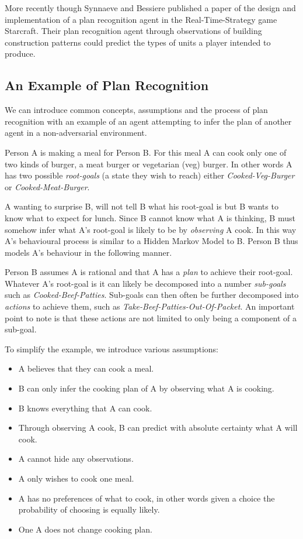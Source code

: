 \documentclass[parskip]{cs4rep}
\begin{document}
More recently though Synnaeve and Bessiere \cite{conf/aiide/SynnaeveB11} published a paper of the design and implementation of a plan recognition agent in the Real-Time-Strategy game Starcraft. Their plan recognition agent through observations of building construction patterns could predict the types of units a player intended to produce.

\subsection{An Example of Plan Recognition}

We can introduce common concepts, assumptions and the process of plan recognition with an example of an agent attempting to infer the plan of another agent in a non-adversarial environment. 

Person A is making a meal for Person B. For this meal A can cook only one of two kinds of burger, a meat burger or vegetarian (veg) burger. In other words A has two possible \textit{root-goals} (a state they wish to reach) either \textit{Cooked-Veg-Burger} or \textit{Cooked-Meat-Burger}. 

A wanting to surprise B, will not tell B what his root-goal is but B wants to know what to expect for lunch. Since B cannot know what A is thinking, B must somehow infer what A's root-goal is likely to be by \textit{observing} A cook. In this way A's behavioural process is similar to a Hidden Markov Model to B. Person B thus models A's behaviour in the following manner. 

Person B assumes A is rational and that A has a \textit{plan} to achieve their root-goal. Whatever A's root-goal is it can likely be decomposed into a number \textit{sub-goals} such as \textit{Cooked-Beef-Patties}. Sub-goals can then often be further decomposed into \textit{actions} to achieve them, such as \textit{Take-Beef-Patties-Out-Of-Packet}. An important point to note is that these actions are not limited to only being a component of a sub-goal.

To simplify the example, we introduce various assumptions:

\begin{itemize}
\item
A believes that they can cook a meal.
\item
B can only infer the cooking plan of A by observing what A is cooking.
\item
B knows everything that A can cook.
\item
Through observing A cook, B can predict with absolute certainty what A will cook.
\item
A cannot hide any observations.
\item
A only wishes to cook one meal.
\item
A has no preferences of what to cook, in other words given a choice the probability of choosing is equally likely.
\item
One A does not change cooking plan.
\end{itemize}
\end{document}
